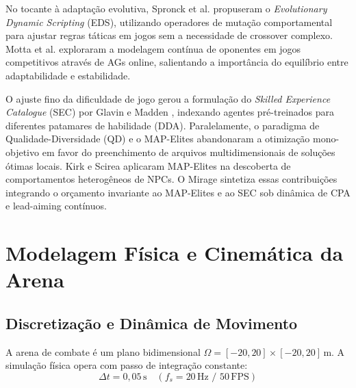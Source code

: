 \documentclass[10pt,conference,twocolumn]{article}
\begin{document}
No tocante à adaptação evolutiva, Spronck et al. \cite{spronck2006adaptive} propuseram o \textit{Evolutionary Dynamic Scripting} (EDS), utilizando operadores de mutação comportamental para ajustar regras táticas em jogos sem a necessidade de crossover complexo. Motta et al. \cite{motta2016online} exploraram a modelagem contínua de oponentes em jogos competitivos através de AGs online, salientando a importância do equilíbrio entre adaptabilidade e estabilidade.

O ajuste fino da dificuldade de jogo gerou a formulação do \textit{Skilled Experience Catalogue} (SEC) por Glavin e Madden \cite{glavin2015skilled}, indexando agentes pré-treinados para diferentes patamares de habilidade (DDA). Paralelamente, o paradigma de Qualidade-Diversidade (QD) e o MAP-Elites \cite{mouret2015illuminating, lehman2011abandoning, cully2015robots} abandonaram a otimização mono-objetivo em favor do preenchimento de arquivos multidimensionais de soluções ótimas locais. Kirk e Scirea \cite{kirk2020exploring} aplicaram MAP-Elites na descoberta de comportamentos heterogêneos de NPCs. O Mirage sintetiza essas contribuições integrando o orçamento invariante ao MAP-Elites e ao SEC sob dinâmica de CPA e lead-aiming contínuos.

\section{Modelagem Física e Cinemática da Arena}
\label{sec:cinematica}

\subsection{Discretização e Dinâmica de Movimento}
A arena de combate é um plano bidimensional $\Omega = [-20, 20] \times [-20, 20]\,\text{m}$. A simulação física opera com passo de integração constante:
\begin{equation}
\Delta t = 0{,}05\,\text{s} \quad (f_s = 20\,\text{Hz} \text{ / } 50\,\text{FPS})
\end{equation}
\end{document}
